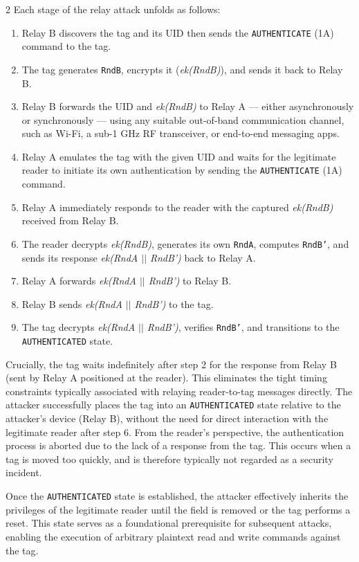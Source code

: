 \documentclass[10pt,letterpaper]{article}
\begin{document}
\begin{multicols}{2}
Each stage of the relay attack unfolds as follows:
\begin{enumerate}
    \item Relay B discovers the tag and its UID then sends the \texttt{AUTHENTICATE} (1A) command to the tag.
    \item The tag generates \texttt{RndB}, encrypts it (\textit{ek(RndB)}), and sends it back to Relay B.
    \item Relay B forwards the UID and \textit{ek(RndB)} to Relay A --- either asynchronously or synchronously --- using any suitable out-of-band communication channel, such as Wi-Fi, a sub-1 GHz RF transceiver, or end-to-end messaging apps.
    \item Relay A emulates the tag with the given UID and waits for the legitimate reader to initiate its own authentication by sending the \texttt{AUTHENTICATE} (1A) command.
    \item Relay A immediately responds to the reader with the captured \textit{ek(RndB)} received from Relay B.
    \item The reader decrypts \textit{ek(RndB)}, generates its own \texttt{RndA}, computes \texttt{RndB'}, and sends its response \textit{ek(RndA $||$ RndB')} back to Relay A.
    \item Relay A forwards \textit{ek(RndA $||$ RndB')} to Relay B.
    \item Relay B sends \textit{ek(RndA $||$ RndB')} to the tag.
    \item The tag decrypts \textit{ek(RndA $||$ RndB')}, verifies \texttt{RndB'}, and transitions to the \texttt{AUTHENTICATED} state.
\end{enumerate}
Crucially, the tag waits indefinitely after step 2 for the response from Relay B (sent by Relay A positioned at the reader). This eliminates the tight timing constraints typically associated with relaying reader-to-tag messages directly. The attacker successfully places the tag into an \texttt{AUTHENTICATED} state relative to the attacker's device (Relay B), without the need for direct interaction with the legitimate reader after step 6.
From the reader's perspective, the authentication process is aborted due to the lack of a response from the tag. This occurs when a tag is moved too quickly, and is therefore typically not regarded as a security incident.

Once the \texttt{AUTHENTICATED} state is established, the attacker effectively inherits the privileges of the legitimate reader until the field is removed or the tag performs a reset. This state serves as a foundational prerequisite for subsequent attacks, enabling the execution of arbitrary plaintext read and write commands against the tag.


\end{multicols}
\end{document}
